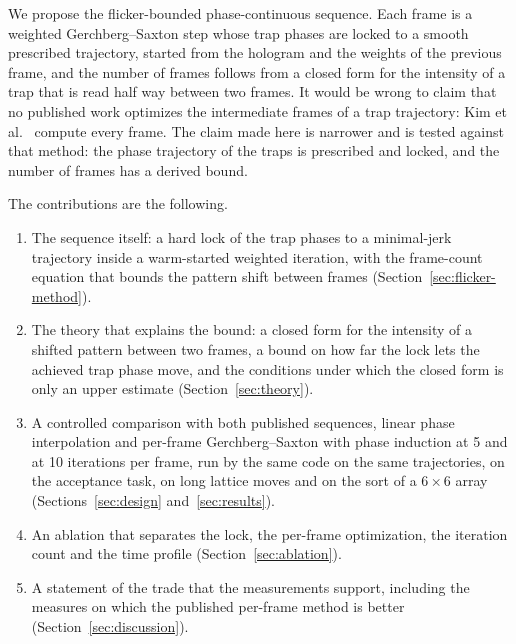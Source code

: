 We propose the flicker-bounded phase-continuous sequence. Each frame is a weighted Gerchberg--Saxton step whose trap phases are locked to a smooth prescribed trajectory, started from the hologram and the weights of the previous frame, and the number of frames follows from a closed form for the intensity of a trap that is read half way between two frames. It would be wrong to claim that no published work optimizes the intermediate frames of a trap trajectory: Kim et al.~\cite{kimoe} compute every frame. The claim made here is narrower and is tested against that method: the phase trajectory of the traps is prescribed and locked, and the number of frames has a derived bound.

The contributions are the following.
\begin{enumerate}
\item The sequence itself: a hard lock of the trap phases to a minimal-jerk trajectory inside a warm-started weighted iteration, with the frame-count equation that bounds the pattern shift between frames (Section~\ref{sec:flicker-method}).
\item The theory that explains the bound: a closed form for the intensity of a shifted pattern between two frames, a bound on how far the lock lets the achieved trap phase move, and the conditions under which the closed form is only an upper estimate (Section~\ref{sec:theory}).
\item A controlled comparison with both published sequences, linear phase interpolation and per-frame Gerchberg--Saxton with phase induction at 5 and at 10 iterations per frame, run by the same code on the same trajectories, on the acceptance task, on long lattice moves and on the sort of a $6\times6$ array (Sections~\ref{sec:design} and~\ref{sec:results}).
\item An ablation that separates the lock, the per-frame optimization, the iteration count and the time profile (Section~\ref{sec:ablation}).
\item A statement of the trade that the measurements support, including the measures on which the published per-frame method is better (Section~\ref{sec:discussion}).
\end{enumerate}

